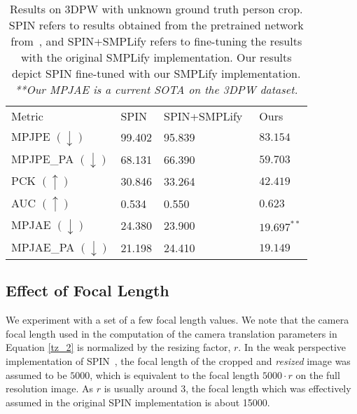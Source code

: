 \documentclass[runningheads]{llncs}
\begin{document}
\setlength{\tabcolsep}{4pt}
\begin{table}
	\begin{center}
		\caption{Results on 3DPW  with unknown ground truth person crop. SPIN refers to results obtained from the pretrained network from~\cite{kolotouros2019learning}, and SPIN+SMPLify refers to fine-tuning the results with the original SMPLify implementation. Our results depict SPIN fine-tuned with our SMPLify implementation. \emph{**Our MPJAE is a current SOTA on the 3DPW dataset.} }
		\label{table:results_ours}
		\begin{tabular}{llll}
			\hline\noalign{\smallskip}
			Metric &  SPIN~\cite{kolotouros2019learning} &SPIN+SMPLify~\cite{kolotouros2019learning} & Ours \\
			\noalign{\smallskip}
			\hline
			\noalign{\smallskip}
			MPJPE $ (\downarrow) $ & 99.402 & 95.839 & $ \bm{83.154} $\\
			{MPJPE\_PA} $ (\downarrow) $& 68.131 & 66.390 & $ \bm{59.703} $\\
			PCK $ (\uparrow) $& 30.846& 33.264 & $ \bm{42.419} $\\
			AUC $ (\uparrow) $& 0.534 & 0.550 & $ \bm{0.623} $\\
			MPJAE $ (\downarrow) $& 24.380 & 23.900 & $ \bm{19.697^{**}} $\\
			{MPJAE\_PA} $ (\downarrow) $& 21.198 & 24.410 & $ \bm{19.149} $\\
			\hline
		\end{tabular}
	\end{center}
\end{table}
\setlength{\tabcolsep}{1.4pt}





\subsection{Effect of Focal Length}
\label{sec:focal_length}

We experiment with a set of a few focal length values. We note that the camera focal length used in the computation of the camera translation parameters in Equation \ref{tz_2} is normalized by the resizing factor, $ r $.  In the weak perspective implementation of SPIN~\cite{kolotouros2019learning}, the  focal length of the cropped and \emph{resized} image was assumed to be $ 5000 $,  which is equivalent to the focal length $5000 \cdot r$ on the full resolution image. As $ r $ is usually around 3, the focal length which was effectively assumed in the original SPIN implementation is about 15000.   
\end{document}
